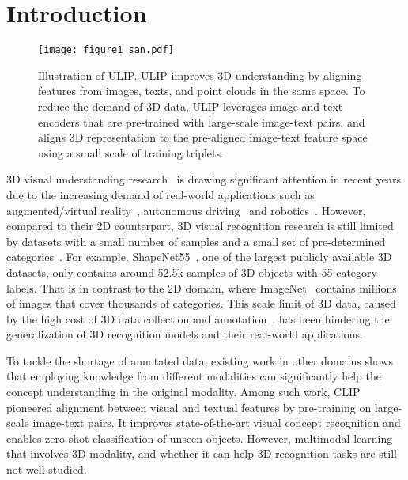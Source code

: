 \documentclass[10pt,twocolumn,letterpaper]{article}
\begin{document}
\section{Introduction}
\label{sec:intro}



\begin{figure}[hbt]
    \centering
    \texttt{[image: figure1\_san.pdf]}
    \caption{Illustration of ULIP. ULIP improves 3D understanding by aligning features from images, texts, and point clouds in the same space. To reduce the demand of 3D data, ULIP leverages image and text encoders that are pre-trained with large-scale image-text pairs, and aligns 3D representation to the pre-aligned image-text feature space using a small scale of training triplets. }
    \label{fig:alignment}
\end{figure}

3D visual understanding research~\cite{landrieu2018large, hu2020randla, liu2019densepoint, li2021lidar, graham20183d, choy20163d} is drawing significant attention in recent years due to the increasing demand of real-world applications such as augmented/virtual reality~\cite{vu2022softgroup, liu2021group, misra2021end, armeni20163d}, autonomous driving~\cite{yin2021center, li2022deepfusion} and robotics~\cite{wojek2011monocular, cadena2016multi}.
However, compared to their 2D counterpart, 3D visual recognition research is still limited by datasets with a small number of samples and a small set of pre-determined categories~\cite{Uy_2019_ICCV, wu20153d}.
For example, ShapeNet55~\cite{chang2015shapenet}, one of the largest publicly available 3D datasets, only contains around 52.5k samples of 3D objects with 55 category labels. 
That is in contrast to the 2D domain, where ImageNet~\cite{deng2009imagenet} contains millions of images that cover thousands of categories.
This scale limit of 3D data, caused by the high cost of 3D data collection and annotation~\cite{yu2022point, chang2015shapenet, goyal2021revisiting, wu20153d}, has been hindering the generalization of 3D recognition models and their real-world applications.  


To tackle the shortage of annotated data,  existing work in other domains shows that employing knowledge from different modalities can significantly help the concept understanding in the original modality\cite{radford2021learning,xing2019adaptive}. 
Among such work, CLIP~\cite{radford2021learning} pioneered alignment between visual and textual features by pre-training on large-scale image-text pairs. It improves state-of-the-art visual concept recognition and enables zero-shot classification of unseen objects.
However, multimodal learning that involves 3D modality, and whether it can help 3D recognition tasks are still not well studied.
\end{document}
